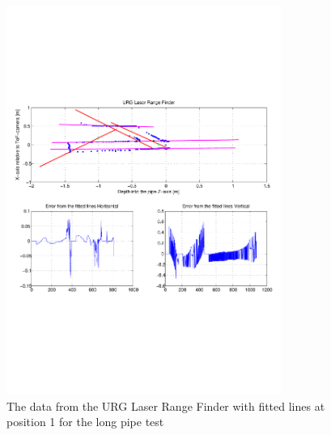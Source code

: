 \begin{figure}[htbp]
    \centering
    \includegraphics[width=0.8\textwidth]{pics/longpipe-urg-2d}
    \caption{The data from the URG Laser Range Finder with fitted lines at position 1 for
    the long pipe test}
    \label{chap7:fig-longpipe-urg-2d}
\end{figure}

